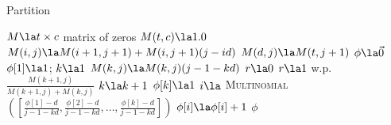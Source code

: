 %
%	
%	

\begin{algorithm}
	\caption{Partition} \label{alg:samplepartition}
	\begin{algorithmic}[1]
	
		\State $M \la  t \times c$ matrix of zeros
		\State $M(t,c) \la 1.0$
				\State $M(i,j) \la M(i +1, j+1) + M(i,j+1)(j - id)$ 
			\EndFor
			\State $M(d,j) \la M(t,j+1)$
		\EndFor
		\State $\phi \la \vec 0$ 
		\State $\phi[1] \la 1$;  $k \la 1$
			\State $M(k,j) \la M(k,j)(j-1 -k d)$
			\State $r \la 0$
			\State $r \la 1 $ w.p. $\frac{M(k+1,j)}{M(k+1,j) + M(k,j)}$
				\State $k \la k + 1$
				\State $\phi[k]  \la 1$
			\Else
				\State $i \la$ \textsc{Multinomial}$([\frac{\phi[1] - d}{j-1 -kd}, \frac{\phi[2] - d}{j-1 -kd}, \ldots, \frac{\phi[k] - d}{j-1 -kd}])$
				\State $\phi[i] \la \phi[i] + 1$
			\EndIf
		\EndFor
		\State \Return $\phi$
	\EndFunction
		\end{algorithmic}
\end{algorithm}

%
%
%				
%

